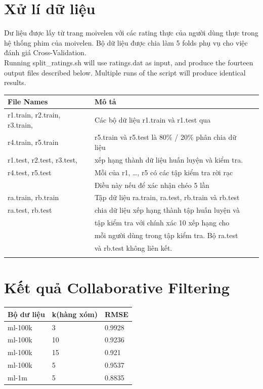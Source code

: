 \documentclass[a4paper,11pt]{report}
\begin{document}
\section{Xử lí dữ liệu}
Dư liệu được lấy từ  trang moivelen với các rating thực của người dùng thực trong hệ thống phim của moivelen. Bộ dữ liệu được chia làm 5 folds phụ vụ cho việc đánh giá Cross-Validation. \\
Running split\_ratings.sh will use ratings.dat as input, and produce the fourteen output files described below. Multiple runs of the script will produce identical results. \\
\begin{center}
\begin{longtable}{|l|l|l|} 
\hline
File Names & Mô tả  \\
\hline
r1.train, r2.train, r3.train, & Các bộ dữ liệu r1.train và r1.test qua \\
r4.train, r5.train &  r5.train và r5.test là 80\% / 20\% phân chia dữ liệu \\
r1.test, r2.test, r3.test, & xếp hạng thành dữ liệu huấn luyện và kiểm tra. \\
r4.test, r5.test & Mỗi của r1, \ldots, r5 có các tập kiểm tra rời rạc \\
& Điều này nếu để xác nhận chéo 5 lần \\
\hline
ra.train, rb.train & Tập dữ liệu ra.train, ra.test, rb.train và rb.test\\ 
ra.test, rb.test & chia dữ liệu xếp hạng thành tập huấn luyện và \\
				& tập kiểm tra với chính xác 10 xếp hạng cho\\
				&  mỗi người dùng trong tập kiểm tra. Bộ ra.test \\
				&  và rb.test không liên kết.\\
				& \\
				\hline
\end{longtable}
\end{center}
\newpage
\section{Kết quả Collaborative Filtering}
\begin{center}
\begin{longtable}{|l|l|l|}
\hline
Bộ dư liệu & k(hàng xóm) & RMSE \\ 
\hline
ml-100k & 3 &  0.9928 \\
ml-100k & 10 &  0.9236\\
ml-100k & 15 &  0.921\\
ml-100k & 5 & 0.9537 \\
ml-1m & 5 & 0.8835 \\
\hline
\end{longtable}
\end{center}
\end{document}
